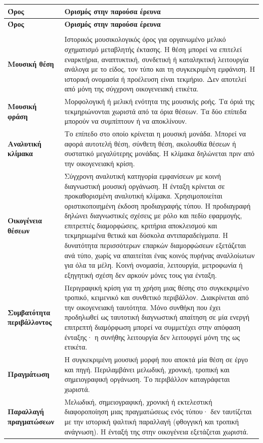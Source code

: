\documentclass[11pt,a4paper]{article}
\begin{document}
{\small
\begin{xltabular}{\textwidth}{@{}>{\RaggedRight\arraybackslash}p{0.23\textwidth}Y@{}}
\toprule
\textbf{Όρος} & \textbf{Ορισμός στην παρούσα έρευνα}\tabularnewline
\midrule
\endfirsthead
\toprule
\textbf{Όρος} & \textbf{Ορισμός στην παρούσα έρευνα}\tabularnewline
\midrule
\endhead
\midrule
{}\tabularnewline
\endfoot
\bottomrule
\endlastfoot
\textbf{Μουσική θέση} & Ιστορικός μουσικολογικός όρος για οργανωμένο μελικό σχηματισμό μεταβλητής έκτασης. Η θέση μπορεί να επιτελεί εναρκτήρια, αναπτυκτική, συνδετική ή καταληκτική λειτουργία ανάλογα με το είδος, τον τύπο και τη συγκεκριμένη εμφάνιση. Η ιστορική ονομασία ή προέλευση είναι τεκμήριο. Δεν αποτελεί από μόνη της σύγχρονη οικογενειακή ετικέτα.\tabularnewline
\midrule
\textbf{Μουσική φράση} & Μορφολογική ή μελική ενότητα της μουσικής ροής. Τα όριά της τεκμηριώνονται χωριστά από τα όρια θέσεων. Τα δύο επίπεδα μπορούν να συμπίπτουν ή να αποκλίνουν.\tabularnewline
\midrule
\textbf{Αναλυτική κλίμακα} & Το επίπεδο στο οποίο κρίνεται η μουσική μονάδα. Μπορεί να αφορά αυτοτελή θέση, σύνθετη θέση, ακολουθία θέσεων ή συστατικό μεγαλύτερης μονάδας. Η κλίμακα δηλώνεται πριν από την οικογενειακή κρίση.\tabularnewline
\midrule
\textbf{Οικογένεια θέσεων} & Σύγχρονη αναλυτική κατηγορία εμφανίσεων με κοινή διαγνωστική μουσική οργάνωση. Η ένταξη κρίνεται σε προκαθορισμένη αναλυτική κλίμακα. Χρησιμοποιείται οριστικοποιημένη έκδοση προδιαγραφής τύπου. Η προδιαγραφή δηλώνει διαγνωστικές σχέσεις με ρόλο και πεδίο εφαρμογής, επιτρεπτές διαμορφώσεις, κριτήρια αποκλεισμού και τεκμηριωμένα θετικά και δύσκολα αντιπαραδείγματα. Η δυνατότητα περισσότερων επαρκών διαμορφώσεων εξετάζεται ανά τύπο, χωρίς να απαιτείται ένας κοινός πυρήνας αναλλοίωτων για όλα τα μέλη. Κοινή ονομασία, λειτουργία, μετροφωνία ή εξηγητική σχέση δεν αρκούν μόνες τους για ένταξη.\tabularnewline
\midrule
\textbf{Συμβατότητα περιβάλλοντος} & Περιγραφική κρίση για τη χρήση μιας θέσης στο συγκεκριμένο τροπικό, κειμενικό και συνθετικό περιβάλλον. Διακρίνεται από την οικογενειακή ταυτότητα. Μόνο συνθήκη που έχει προδηλωθεί ως ταυτοτική διαγνωστική απαίτηση σε μία ενεργή επιτρεπτή διαμόρφωση μπορεί να συμμετέχει στην απόφαση ένταξης· η συνήθης λειτουργία δεν λειτουργεί μόνη της ως ετικέτα.\tabularnewline
\midrule
\textbf{Πραγμάτωση} & Η συγκεκριμένη μουσική μορφή που αποκτά μία θέση σε έργο και πηγή. Περιλαμβάνει μελωδική, χρονική, τροπική και σημειογραφική οργάνωση. Το περιβάλλον καταγράφεται χωριστά.\tabularnewline
\midrule
\textbf{Παραλλαγή πραγματώσεων} & Μελωδική, σημειογραφική, χρονική ή εκτελεστική διαφοροποίηση μιας πραγματώσεως ενός τύπου· δεν ταυτίζεται με την ιστορική ψαλτική παραλλαγή (φθογγική και τροπική ανάγνωση). Η ένταξή της στην οικογένεια εξετάζεται χωριστά.\tabularnewline

\end{xltabular}}
\end{document}

